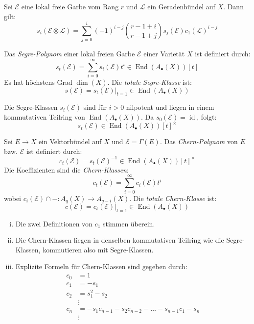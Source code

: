 \documentclass[10pt,a4paper]{article}
\begin{document}
\begin{proposition}
Sei $\mathcal{E}$ eine lokal freie Garbe vom Rang $r$ und $\mathcal{L}$ ein Geradenbündel auf $X$. Dann gilt:
\[ s_i(\mathcal{E}\otimes\mathcal{L}) = \sum_{j=0}^i(-1)^{i-j} \binom{r-1+i}{r-1+j}s_j(\mathcal{E}) c_1(\mathcal{L})^{i-j} \]
\end{proposition}

\begin{definition}
Das \textit{Segre-Polynom} einer lokal freien Garbe $\mathcal{E}$ einer Varietät $X$ ist definiert durch:
\[ s_t(\mathcal{E}) = \sum_{i = 0}^\infty s_i(\mathcal{E})t^i \in\operatorname{End}(A_\bullet(X))[t] \]
Es hat höchstens Grad $\dim(X)$. Die \textit{totale Segre-Klasse} ist:
\[ s(\mathcal{E}) = s_t(\mathcal{E})|_{t = 1} \in\operatorname{End}(A_\bullet(X)) \]
\end{definition}

\begin{remark}
Die Segre-Klassen $s_i(\mathcal{E})$ sind für $i>0$  nilpotent und liegen in einem kommutativen Teilring von $\operatorname{End}(A_\bullet(X))$. Da $s_0(\mathcal{E}) = \operatorname{id}$, folgt:
\[ s_t(\mathcal{E}) \in\operatorname{End}(A_\bullet(X))[t]^\times \]
\end{remark}

\begin{definition}
Sei $E\to X$ ein Vektorbündel auf $X$ und $\mathcal{E} = \Gamma(E)$. Das \textit{Chern-Polynom} von $E$ bzw. $\mathcal{E}$ ist definiert durch:
\[ c_t(\mathcal{E}) = s_t(\mathcal{E})^{-1} \in\operatorname{End}(A_\bullet(X))[t]^\times \]
Die Koeffizienten sind die \textit{Chern-Klassen}:   
\[ c_t(\mathcal{E}) = \sum_{i =0}^\infty c_i(\mathcal{E}) t^i \]
wobei $c_i(\mathcal{E})\cap - : A_q(X)\to A_{q-i}(X)$. Die \textit{totale Chern-Klasse} ist:
\[ c(\mathcal{E}) = c_t(\mathcal{E})|_{t =1}\in\operatorname{End}(A_\bullet(X)) \]
\end{definition}

\begin{remark}
\begin{enumerate}[(i)]
\item Die zwei Definitionen von $c_1$ stimmen überein.
\item Die Chern-Klassen liegen in denselben kommutativen Teilring wie die Segre-Klassen, kommutieren also mit Segre-Klassen.
\item Explizite Formeln für Chern-Klassen sind gegeben durch:
\begin{align*}
c_0 &= 1\\
c_1 &= -s_1\\
c_2 &= s_1^2 - s_2\\
&\vdots\\
c_n &= -s_1c_{n-1}-s_2c_{n-2}-\ldots -s_{n-1}c_1-s_n\\
&\vdots
\end{align*}
\end{enumerate}
\end{remark}
\end{document}
